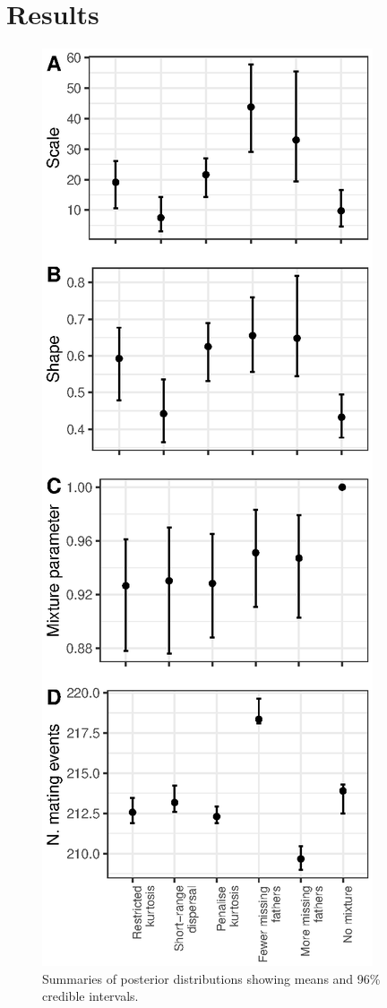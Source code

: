 \documentclass[10pt, a4paper, twocolumn]{article} %
\begin{document}
\section{Results}

\begin{figure}
\includegraphics{posterior_distributions.eps}
\caption{Summaries of posterior distributions showing means and 96\% credible intervals.}
\label{posterior_summaries}
\end{figure}
\end{document}
